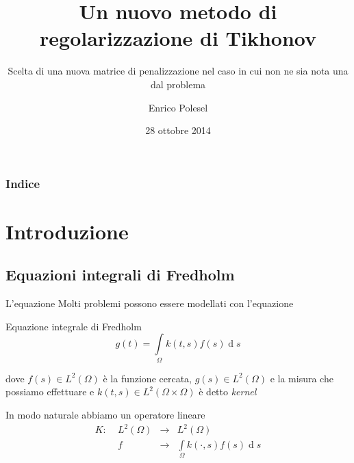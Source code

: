 \documentclass{beamer}
\theoremstyle{plain}
\theoremstyle{definition}
\theoremstyle{remark}
\newcommand{\intl}{\int \limits}
\DeclareMathOperator{\de}{d}
\begin{document}
\title[Un nuovo metodo di regolarizzazione di Tikhonov]{Un nuovo metodo di regolarizzazione di Tikhonov}
\subtitle{Scelta di una nuova matrice di penalizzazione nel caso in
  cui non ne sia nota una dal problema}
\author{Enrico Polesel}
\date{28 ottobre 2014}




\begin{frame}[plain]
  \titlepage
\end{frame}

\begin{frame}[plain]
 \frametitle{Indice}
 \tableofcontents
\end{frame}




\AtBeginSubsection[]
{
  \begin{frame}[plain]{\secname $\rightarrow$ \subsecname}
    \tableofcontents[currentsubsection]
  \end{frame}
}

\section{Introduzione}

\subsection{Equazioni integrali di Fredholm}

\begin{frame}{L'equazione}
  Molti problemi possono essere modellati con l'equazione
  \begin{block}{Equazione integrale di Fredholm}
    \[ g(t) = \intl _{\Omega} k(t,s) f(s) \de s \]
  \end{block}
  dove $f(s)\in L^2(\Omega)$ è la funzione cercata, $g(s)\in
  L^2(\Omega)$ e la misura che possiamo effettuare e $k(t,s)\in
  L^2(\Omega \times \Omega)$ è detto \textit{kernel}
  \vfill
  
  In modo naturale abbiamo un operatore lineare
  \[ \begin{matrix}
    K:\; &L^2(\Omega) &\longrightarrow &L^2(\Omega)\\
    & f &\longrightarrow & \intl _\Omega k(\cdot , s) f(s) \de s 
  \end{matrix} \]

\end{frame}
\end{document}
